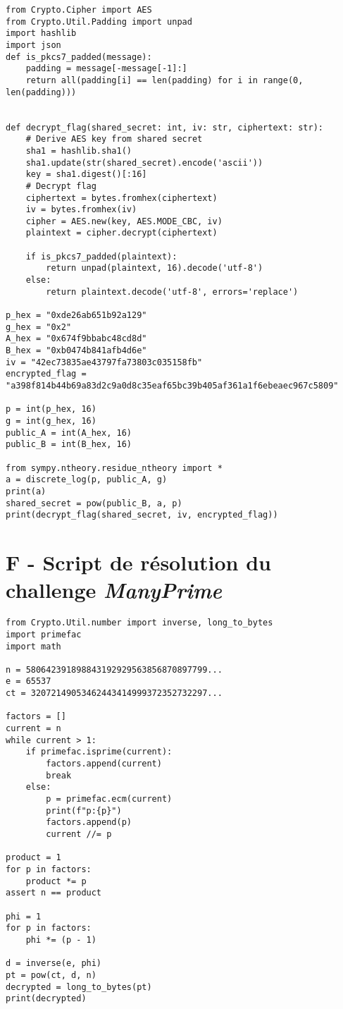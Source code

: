 \begin{lstlisting}
from Crypto.Cipher import AES
from Crypto.Util.Padding import unpad
import hashlib
import json
def is_pkcs7_padded(message):
    padding = message[-message[-1]:]
    return all(padding[i] == len(padding) for i in range(0, len(padding)))


def decrypt_flag(shared_secret: int, iv: str, ciphertext: str):
    # Derive AES key from shared secret
    sha1 = hashlib.sha1()
    sha1.update(str(shared_secret).encode('ascii'))
    key = sha1.digest()[:16]
    # Decrypt flag
    ciphertext = bytes.fromhex(ciphertext)
    iv = bytes.fromhex(iv)
    cipher = AES.new(key, AES.MODE_CBC, iv)
    plaintext = cipher.decrypt(ciphertext)

    if is_pkcs7_padded(plaintext):
        return unpad(plaintext, 16).decode('utf-8')
    else:
        return plaintext.decode('utf-8', errors='replace')

p_hex = "0xde26ab651b92a129"
g_hex = "0x2"
A_hex = "0x674f9bbabc48cd8d"
B_hex = "0xb0474b841afb4d6e"
iv = "42ec73835ae43797fa73803c035158fb"
encrypted_flag = "a398f814b44b69a83d2c9a0d8c35eaf65bc39b405af361a1f6ebeaec967c5809"

p = int(p_hex, 16)
g = int(g_hex, 16)
public_A = int(A_hex, 16)
public_B = int(B_hex, 16)

from sympy.ntheory.residue_ntheory import *
a = discrete_log(p, public_A, g) 
print(a)
shared_secret = pow(public_B, a, p)
print(decrypt_flag(shared_secret, iv, encrypted_flag))
\end{lstlisting}

\newpage %
\section*{F - Script de résolution du challenge \textit{ManyPrime}}
\label{annexe:script-manyprime}

\begin{lstlisting}
from Crypto.Util.number import inverse, long_to_bytes
import primefac
import math

n = 580642391898843192929563856870897799...
e = 65537
ct = 32072149053462443414999372352732297...

factors = []
current = n
while current > 1:
    if primefac.isprime(current):
        factors.append(current)
        break
    else:
        p = primefac.ecm(current)
        print(f"p:{p}")
        factors.append(p)
        current //= p

product = 1
for p in factors:
    product *= p
assert n == product

phi = 1
for p in factors:
    phi *= (p - 1)

d = inverse(e, phi)
pt = pow(ct, d, n)
decrypted = long_to_bytes(pt)
print(decrypted)
\end{lstlisting}

